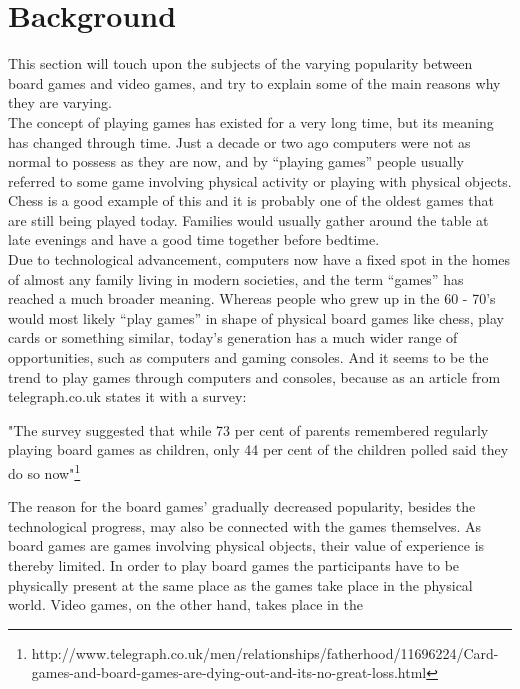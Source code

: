 
\section{Background}

This section will touch upon the subjects of the varying popularity between
 board games and video games, and try to explain some of the main reasons why
 they are varying.\newline
\\
The concept of playing games has existed for a very long time, but its meaning
 has changed through time. Just a decade or two ago computers were not as
 normal to possess as they are now, and by “playing games” people usually
 referred to some game involving physical activity or playing with physical
  objects. Chess is a good example of this and it is probably one of the
  oldest games that are still being played today.
Families would usually gather around the table at late evenings and have a
good time together before bedtime.\newline
\\
Due to technological advancement, computers now have a fixed spot in the
 homes of almost any family living in modern societies, and the term “games”
 has reached a much broader meaning. Whereas people who grew up in the
  60 - 70’s would most likely “play games” in shape of physical board
  games like chess, play cards or something similar, today’s generation
  has a much wider range of opportunities, such as computers and gaming
   consoles. And it seems to be the trend to play games through computers
    and consoles, because as an article from telegraph.co.uk states it with
     a survey:
\begin{displayquote}
"The survey suggested that while 73 per cent of parents remembered regularly
 playing board games as children, only 44 per cent of the children polled said
 they do so now"\footnote{http://www.telegraph.co.uk/men/relationships/fatherhood/11696224/Card-games-and-board-games-are-dying-out-and-its-no-great-loss.html}
\end{displayquote}
The reason for the board games' gradually decreased popularity, besides
 the technological progress, may also be connected with the games themselves.
  As board games are games involving physical objects, their value of
   experience is thereby limited. In order to play board games the participants
   have to be physically present at the same place as the games take place in
   the physical world. Video games, on the other hand, takes place in the
